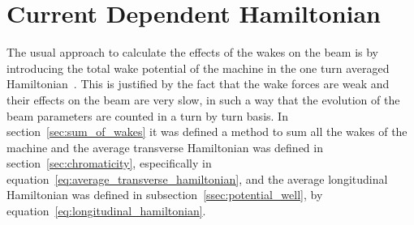\section{Current Dependent Hamiltonian}

    The usual approach to calculate the effects of the wakes on the beam is by introducing the total wake potential of the machine in the one turn averaged Hamiltonian~\cite{Berg1996,Lindberg2016}. This is justified by the fact that the wake forces are weak and their effects on the beam are very slow, in such a way that the evolution of the beam parameters are counted in a turn by turn basis. In section~\ref{sec:sum_of_wakes} it was defined a method to sum all the wakes of the machine and the average transverse Hamiltonian was defined in section~\ref{sec:chromaticity}, especifically in equation~\eqref{eq:average_transverse_hamiltonian}, and the average longitudinal Hamiltonian was defined in subsection~\ref{ssec:potential_well}, by equation~\eqref{eq:longitudinal_hamiltonian}.


